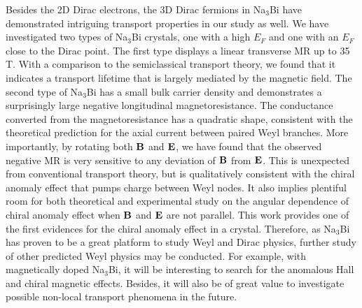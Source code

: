 Besides the 2D Dirac electrons, the 3D Dirac fermions in Na$_3$Bi have demonstrated intriguing transport properties in our study as well. We have investigated two types of Na$_3$Bi crystals, one with a high $E_F$ and one with an $E_F$ close to the Dirac point. The first type displays a linear transverse MR up to 35 T. With a comparison to the semiclassical transport theory, we found that it indicates a transport lifetime that is largely mediated by the magnetic field. The second type of Na$_3$Bi has a small bulk carrier density and demonstrates a surprisingly large negative longitudinal magnetoresistance. The conductance converted from the magnetoresistance has a quadratic shape, consistent with the theoretical prediction for the axial current between paired Weyl branches\cite{Son2013}. More importantly, by rotating both $\bf B$ and $\bf E$, we have found that the observed negative MR is very sensitive to any deviation of $\bf B$ from $\bf E$. This is unexpected from conventional transport theory, but is qualitatively consistent with the chiral anomaly effect that pumps charge between Weyl nodes. It also implies plentiful room for both theoretical and experimental study on the angular dependence of chiral anomaly effect when $\bf B$ and $\bf E$ are not parallel. This work provides one of the first evidences for the chiral anomaly effect in a crystal. Therefore, as Na$_3$Bi has proven to be a great platform to study Weyl and Dirac physics, further study of other predicted Weyl physics may be conducted. For example, with magnetically doped Na$_3$Bi, it will be interesting to search for the anomalous Hall and chiral magnetic effects. Besides, it will also be of great value to investigate possible non-local transport phenomena\cite{Parameswaran2014} in the future.

